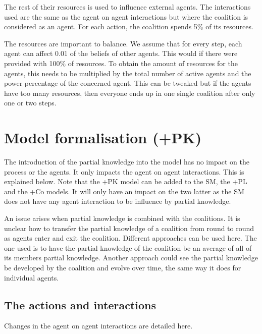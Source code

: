 \documentclass[11pt]{article}
\begin{document}
The rest of their resources is used to influence external agents. The interactions used are the same as the agent on agent interactions but where the coalition is considered as an agent. For each action, the coalition spends 5\% of its resources.

The resources are important to balance. We assume that for every step, each agent can affect 0.01 of the beliefs of other agents. This would if there were provided with 100\% of resources. To obtain the amount of resources for the agents, this needs to be multiplied by the total number of active agents and the power percentage of the concerned agent. This can be tweaked but if the agents have too many resources, then everyone ends up in one single coalition after only one or two steps.



\section{Model formalisation (+PK)}

The introduction of the partial knowledge into the model has no impact on the process or the agents. It only impacts the agent on agent interactions. This is explained below. Note that the +PK model can be added to the SM, the +PL and the +Co models. It will only have an impact on the two latter as the SM does not have any agent interaction to be influence by partial knowledge.

An issue arises when partial knowledge is combined with the coalitions. It is unclear how to transfer the partial knowledge of a coalition from round to round as agents enter and exit the coalition. Different approaches can be used here. The one used is to have the partial knowledge of the coalition be an average of all of its members partial knowledge. Another approach could see the partial knowledge be developed by the coalition and evolve over time, the same way it does for individual agents.

\subsection{The actions and interactions}

Changes in the agent on agent interactions are detailed here.
\end{document}
